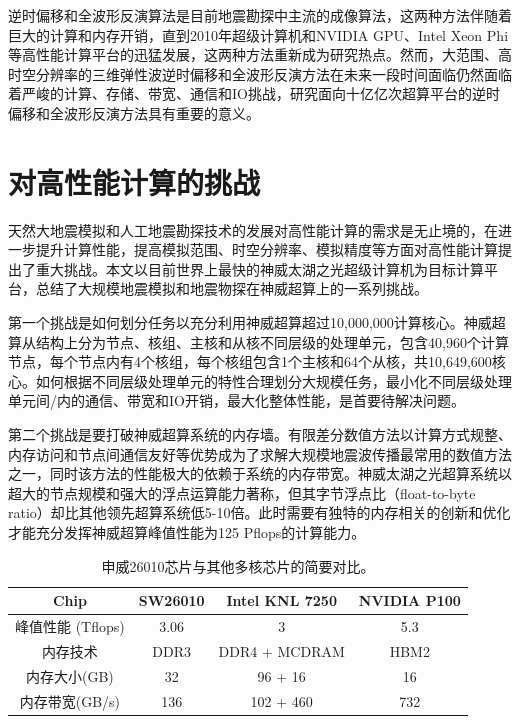 \documentclass[degree=doctor]{thuthesis}
\begin{document}
逆时偏移和全波形反演算法是目前地震勘探中主流的成像算法，这两种方法伴随着巨大的计算和内存开销，直到2010年超级计算机和NVIDIA GPU、Intel Xeon Phi 等高性能计算平台的迅猛发展，这两种方法重新成为研究热点。然而，大范围、高时空分辨率的三维弹性波逆时偏移和全波形反演方法在未来一段时间面临仍然面临着严峻的计算、存储、带宽、通信和IO挑战，研究面向十亿亿次超算平台的逆时偏移和全波形反演方法具有重要的意义。

\section{对高性能计算的挑战}

天然大地震模拟和人工地震勘探技术的发展对高性能计算的需求是无止境的，在进一步提升计算性能，提高模拟范围、时空分辨率、模拟精度等方面对高性能计算提出了重大挑战。本文以目前世界上最快的神威太湖之光超级计算机为目标计算平台，总结了大规模地震模拟和地震物探在神威超算上的一系列挑战。

第一个挑战是如何划分任务以充分利用神威超算超过10,000,000计算核心。神威超算从结构上分为节点、核组、主核和从核不同层级的处理单元，包含40,960个计算节点，每个节点内有4个核组，每个核组包含1个主核和64个从核，共10,649,600核心。如何根据不同层级处理单元的特性合理划分大规模任务，最小化不同层级处理单元间/内的通信、带宽和IO开销，最大化整体性能，是首要待解决问题。

第二个挑战是要打破神威超算系统的内存墙。有限差分数值方法以计算方式规整、内存访问和节点间通信友好等优势成为了求解大规模地震波传播最常用的数值方法之一，同时该方法的性能极大的依赖于系统的内存带宽。神威太湖之光超算系统以超大的节点规模和强大的浮点运算能力著称，但其字节浮点比（float-to-byte ratio）却比其他领先超算系统低5-10倍。此时需要有独特的内存相关的创新和优化才能充分发挥神威超算峰值性能为125 Pflops的计算能力。

\begin{table}[ht]
\caption{申威26010芯片与其他多核芯片的简要对比。}
\label{tb:proc-comp}
\centering
\begin{tabular*}{0.8\columnwidth}{cccc}
\hline\hline
    Chip & SW26010 & Intel KNL 7250 & NVIDIA P100 \\\hline\hline
    峰值性能 (Tflops) & 3.06 & 3 & 5.3 \\\hline
    内存技术   & DDR3 & DDR4 + MCDRAM & HBM2 \\\hline
    内存大小(GB) & 32 & 96 + 16 & 16 \\\hline
    内存带宽(GB/s)  & 136 & 102 + 460 & 732 \\\hline
\end{tabular*}
\end{table}
\end{document}
